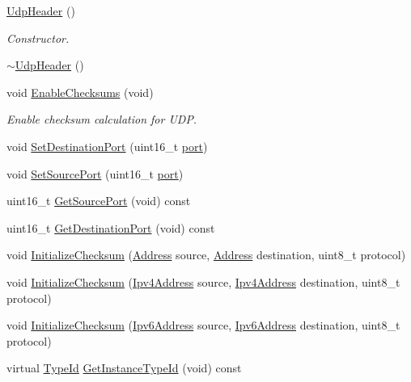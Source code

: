 \begin{DoxyCompactItemize}
\item 
\hyperlink{classns3_1_1UdpHeader_a4191f96ea267104bd9cee67d597dc618}{Udp\+Header} ()
\begin{DoxyCompactList}\small\item\em Constructor. \end{DoxyCompactList}\item 
\hyperlink{classns3_1_1UdpHeader_a5786c752e8518e39fbc601f0fbb3d0c7}{$\sim$\+Udp\+Header} ()
\item 
void \hyperlink{classns3_1_1UdpHeader_a1be7b2d747df6076066ccd6d7dfc7f0d}{Enable\+Checksums} (void)
\begin{DoxyCompactList}\small\item\em Enable checksum calculation for U\+DP. \end{DoxyCompactList}\item 
void \hyperlink{classns3_1_1UdpHeader_af7f8bc1749481efe8ede173a71aa6727}{Set\+Destination\+Port} (uint16\+\_\+t \hyperlink{visualizer-ideas_8txt_a21ff1c530daf8435e00048b7fc2c58e3}{port})
\item 
void \hyperlink{classns3_1_1UdpHeader_ae10a7c9c6cbd645745bebc2a84a78831}{Set\+Source\+Port} (uint16\+\_\+t \hyperlink{visualizer-ideas_8txt_a21ff1c530daf8435e00048b7fc2c58e3}{port})
\item 
uint16\+\_\+t \hyperlink{classns3_1_1UdpHeader_a997d3bd61676248306f932b270c9f9ce}{Get\+Source\+Port} (void) const 
\item 
uint16\+\_\+t \hyperlink{classns3_1_1UdpHeader_ab49d614fd7809513ad1962a34f444dd3}{Get\+Destination\+Port} (void) const 
\item 
void \hyperlink{classns3_1_1UdpHeader_ad5a6b055ebda2305135e6a4e7860e45e}{Initialize\+Checksum} (\hyperlink{classns3_1_1Address}{Address} source, \hyperlink{classns3_1_1Address}{Address} destination, uint8\+\_\+t protocol)
\item 
void \hyperlink{classns3_1_1UdpHeader_a7561b33f83f9745a89e0020b2aec743d}{Initialize\+Checksum} (\hyperlink{classns3_1_1Ipv4Address}{Ipv4\+Address} source, \hyperlink{classns3_1_1Ipv4Address}{Ipv4\+Address} destination, uint8\+\_\+t protocol)
\item 
void \hyperlink{classns3_1_1UdpHeader_a9726d1a24f7f4acada034327707c9a87}{Initialize\+Checksum} (\hyperlink{classns3_1_1Ipv6Address}{Ipv6\+Address} source, \hyperlink{classns3_1_1Ipv6Address}{Ipv6\+Address} destination, uint8\+\_\+t protocol)
\item 
virtual \hyperlink{classns3_1_1TypeId}{Type\+Id} \hyperlink{classns3_1_1UdpHeader_a70260ff9fc703512d9800d25895b9092}{Get\+Instance\+Type\+Id} (void) const 

\end{DoxyCompactItemize}
